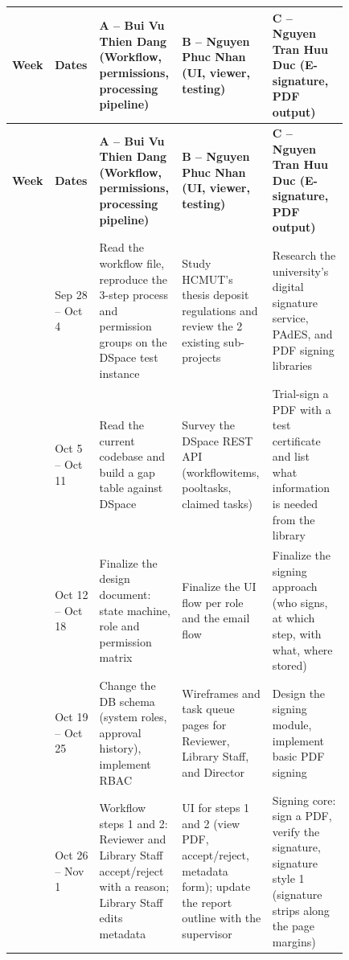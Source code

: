 \documentclass[11pt,a4paper]{report}
\renewcommand{\arraystretch}{1.15}
\begin{document}
{\footnotesize
\renewcommand{\arraystretch}{1.1}
\setlength{\tabcolsep}{3pt}
\begin{longtable}{|>{\raggedright\arraybackslash}p{0.06\linewidth}|>{\raggedright\arraybackslash}p{0.11\linewidth}|>{\raggedright\arraybackslash}p{0.22\linewidth}|>{\raggedright\arraybackslash}p{0.22\linewidth}|>{\raggedright\arraybackslash}p{0.22\linewidth}|}
\hline
\textbf{Week} & \textbf{Dates} & \textbf{A -- Bui Vu Thien Dang (Workflow, permissions, processing pipeline)} & \textbf{B -- Nguyen Phuc Nhan (UI, viewer, testing)} & \textbf{C -- Nguyen Tran Huu Duc (E-signature, PDF output)} \\ \hline
\endfirsthead
\hline
\textbf{Week} & \textbf{Dates} & \textbf{A -- Bui Vu Thien Dang (Workflow, permissions, processing pipeline)} & \textbf{B -- Nguyen Phuc Nhan (UI, viewer, testing)} & \textbf{C -- Nguyen Tran Huu Duc (E-signature, PDF output)} \\ \hline
\endhead
\hline
\endfoot
\hline
\endlastfoot
1 & Sep 28 -- Oct 4 & Read the workflow file, reproduce the 3-step process and permission groups on the DSpace test instance & Study HCMUT's thesis deposit regulations and review the 2 existing sub-projects & Research the university's digital signature service, PAdES, and PDF signing libraries \\ \hline
2 & Oct 5 -- Oct 11 & Read the current codebase and build a gap table against DSpace & Survey the DSpace REST API (workflowitems, pooltasks, claimed tasks) & Trial-sign a PDF with a test certificate and list what information is needed from the library \\ \hline
3 & Oct 12 -- Oct 18 & Finalize the design document: state machine, role and permission matrix & Finalize the UI flow per role and the email flow & Finalize the signing approach (who signs, at which step, with what, where stored) \\ \hline
4 & Oct 19 -- Oct 25 & Change the DB schema (system roles, approval history), implement RBAC & Wireframes and task queue pages for Reviewer, Library Staff, and Director & Design the signing module, implement basic PDF signing \\ \hline
5 & Oct 26 -- Nov 1 & Workflow steps 1 and 2: Reviewer and Library Staff accept/reject with a reason; Library Staff edits metadata & UI for steps 1 and 2 (view PDF, accept/reject, metadata form); update the report outline with the supervisor & Signing core: sign a PDF, verify the signature, signature style 1 (signature strips along the page margins) \\ \hline

\end{longtable}}
\end{document}
